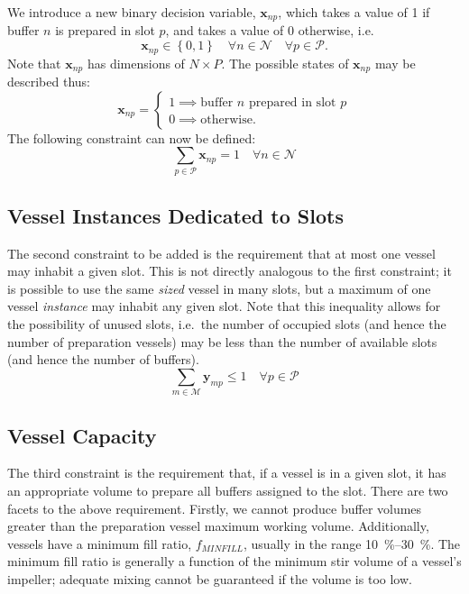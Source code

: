 We introduce a new binary decision variable, $\boldsymbol{x}_{np}$, which takes
a value of 1 if buffer $n$ is prepared in slot $p$, and takes a value of 0
otherwise, i.e.
\begin{equation}
    \boldsymbol{x}_{np} \in \left\{ 0, 1 \right\} \quad \forall n \in 
    \mathcal{N} \quad \forall p \in \mathcal{P}.
    \label{eq.x}
\end{equation}
Note that $\boldsymbol{x}_{np}$ has dimensions of $N \times P$.
The possible states of $\boldsymbol{x}_{np}$ may be described thus:
\begin{equation}
    \boldsymbol{x}_{np} =
    \begin{cases}
        1 \implies \text{buffer $n$ prepared in slot $p$}\\
        0 \implies \text{otherwise.}
    \end{cases}
\end{equation}
The following constraint can now be defined:
\begin{equation}
    \sum_{p \in \mathcal{P}} \boldsymbol{x}_{np} = 1 \quad \forall n \in
    \mathcal{N}
    \label{eq.constr1}
\end{equation}

\subsection{Vessel Instances Dedicated to Slots}\label{SS.constr2}

The second constraint to be added is the requirement that at most one vessel
may inhabit a given slot.
This is not directly analogous to the first constraint; it is possible to
use the same \emph{sized} vessel in many slots, but a maximum of one vessel
\emph{instance} may inhabit any given slot.
Note that this inequality allows for the possibility of unused slots, i.e.\ the
number of occupied slots (and hence the number of preparation vessels) may be
less than the number of available slots (and hence the number of buffers).
\begin{equation}
    \sum_{m \in \mathcal{M}} \boldsymbol{y}_{mp} \le 1 \quad \forall p \in 
    \mathcal{P}
    \label{eq.constr2}
\end{equation}

\subsection{Vessel Capacity}\label{SS.constr3}

The third constraint is the requirement that, if a vessel is in a given slot,
it has an appropriate volume to prepare all buffers assigned to the slot.
There are two facets to the above requirement.
Firstly, we cannot produce buffer volumes greater than the preparation vessel
maximum working volume.
Additionally, vessels have a minimum fill ratio, $f_{\mathit{MINFILL}}$,
usually in the range \SIrange{10}{30}{\percent}.
The minimum fill ratio is generally a function of the minimum stir volume of a
vessel's impeller; adequate mixing cannot be guaranteed if the volume is too
low.

